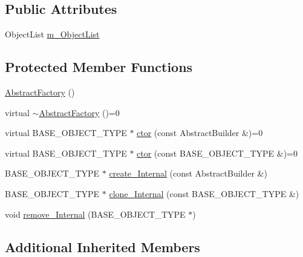 \subsection*{Public Attributes}
\begin{DoxyCompactItemize}
\item 
Object\+List \hyperlink{class_abstract_factory_a3267ed4cf496101f189127b9c512886d}{m\+\_\+\+Object\+List}
\end{DoxyCompactItemize}
\subsection*{Protected Member Functions}
\begin{DoxyCompactItemize}
\item 
\hyperlink{class_abstract_factory_ae487becea96d60bdd7008ffa5f9c8032}{Abstract\+Factory} ()
\item 
virtual \hyperlink{class_abstract_factory_a00e52d4dd98f5f92a573dfc5c60a0156}{$\sim$\+Abstract\+Factory} ()=0
\item 
virtual B\+A\+S\+E\+\_\+\+O\+B\+J\+E\+C\+T\+\_\+\+T\+Y\+P\+E $\ast$ \hyperlink{class_abstract_factory_a3b13f7fe45a9cf9153bd7232374ab294}{ctor} (const Abstract\+Builder \&)=0
\item 
virtual B\+A\+S\+E\+\_\+\+O\+B\+J\+E\+C\+T\+\_\+\+T\+Y\+P\+E $\ast$ \hyperlink{class_abstract_factory_af0d1d74529a379550dd7f4fdf168e1d2}{ctor} (const B\+A\+S\+E\+\_\+\+O\+B\+J\+E\+C\+T\+\_\+\+T\+Y\+P\+E \&)=0
\item 
B\+A\+S\+E\+\_\+\+O\+B\+J\+E\+C\+T\+\_\+\+T\+Y\+P\+E $\ast$ \hyperlink{class_abstract_factory_a2167ba8dba4e66fc291097a3bfded11b}{create\+\_\+\+Internal} (const Abstract\+Builder \&)
\item 
B\+A\+S\+E\+\_\+\+O\+B\+J\+E\+C\+T\+\_\+\+T\+Y\+P\+E $\ast$ \hyperlink{class_abstract_factory_a9ad83bde15f73f109b7e3c8a151cfbe2}{clone\+\_\+\+Internal} (const B\+A\+S\+E\+\_\+\+O\+B\+J\+E\+C\+T\+\_\+\+T\+Y\+P\+E \&)
\item 
void \hyperlink{class_abstract_factory_a7523badc673ee68bfa4b7640b96e4bfa}{remove\+\_\+\+Internal} (B\+A\+S\+E\+\_\+\+O\+B\+J\+E\+C\+T\+\_\+\+T\+Y\+P\+E $\ast$)
\end{DoxyCompactItemize}
\subsection*{Additional Inherited Members}


